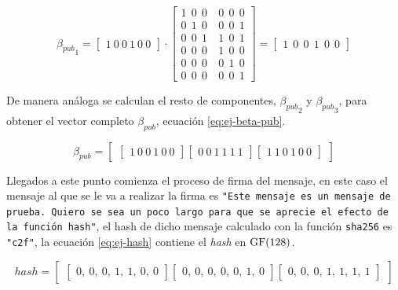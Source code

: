 \begin{equation}\label{eq:ej-beta-pub-1}
	{{\beta_{pub}}_1} = 
	\left[\begin{array}{c}
		1\ 0\ 0\ 1\ 0\ 0
	\end{array}\right] \cdot
	\left[\begin{array}{c|c}
		1\ \ 0\ \ 0\ & 0\ \ 0\ \ 0\\
		0\ \ 1\ \ 0\ & 0\ \ 0\ \ 1\\
		0\ \ 0\ \ 1\ & 1\ \ 0\ \ 1\\
		\hline
		0\ \ 0\ \ 0\ & 1\ \ 0\ \ 0\\
		0\ \ 0\ \ 0\ & 0\ \ 1\ \ 0\\
		0\ \ 0\ \ 0\ & 0\ \ 0\ \ 1
	\end{array}\right] =
	\left[\begin{array}{c}
	1\ \ 0\ \ 0\ \ 1\ \ 0\ \ 0
	\end{array}\right]
\end{equation}

De manera análoga se calculan el resto de componentes, ${\beta_{pub}}_2$ y ${\beta_{pub}}_3$, para obtener el vector completo $\beta_{pub}$, ecuación \ref{eq:ej-beta-pub}.

\begin{equation}\label{eq:ej-beta-pub}
{\beta_{pub}} = \left[
	\begin{array}{c}
	\left[\begin{array}{c}
		1\ 0\ 0\ 1\ 0\ 0
	\end{array}\right]
	
	\left[\begin{array}{c}
		0\ 0\ 1\ 1\ 1\ 1
	\end{array}\right]
	
	\left[\begin{array}{c}
		1\ 1\ 0\ 1\ 0\ 0
	\end{array}\right]
	\end{array}
	\right]
\end{equation}

Llegados a este punto comienza el proceso de firma del mensaje, en este caso el mensaje al que se le va a realizar la firma es \texttt{"{}Este mensaje es un mensaje de prueba. Quiero se sea un poco largo para que se aprecie el efecto de la función hash"{}}, el hash de dicho mensaje calculado con la función \texttt{sha256} es \texttt{"{}c2f"{}}, la ecuación \ref{eq:ej-hash} contiene el \textit{hash} en $\operatorname{GF}(128)$.

\begin{equation}\label{eq:ej-hash}
	{hash} = 
	\left[\begin{array}{c}
		\left[\begin{array}{c}
			0,\ 0,\ 0,\ 1,\ 1,\ 0,\ 0
		\end{array}\right]
		\left[\begin{array}{c}
			0,\ 0,\ 0,\ 0,\ 0,\ 1,\ 0
		\end{array}\right]
		\left[\begin{array}{c}
			0,\ 0,\ 0,\ 1,\ 1,\ 1,\ 1
		\end{array}\right]
	\end{array}\right]
\end{equation}

